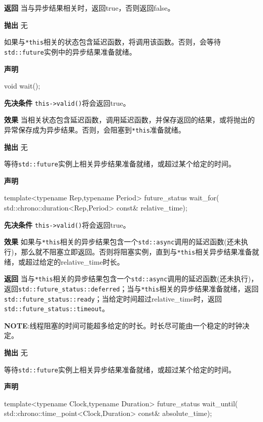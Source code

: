 \textbf{返回}
当与异步结果相关时，返回true，否则返回false。

\textbf{抛出}
无


如果与\texttt{*this}相关的状态包含延迟函数，将调用该函数。否则，会等待\texttt{std::future}实例中的异步结果准备就绪。

\textbf{声明}

\begin{cpp}
void wait();
\end{cpp}

\textbf{先决条件}
\texttt{this->valid()}将会返回true。

\textbf{效果}
当相关状态包含延迟函数，调用延迟函数，并保存返回的结果，或将抛出的异常保存成为异步结果。否则，会阻塞到\texttt{*this}准备就绪。

\textbf{抛出}
无


等待\texttt{std::future}实例上相关异步结果准备就绪，或超过某个给定的时间。

\textbf{声明}

\begin{cpp}
template<typename Rep,typename Period>
future_status wait_for(
    std::chrono::duration<Rep,Period> const& relative_time);
\end{cpp}

\textbf{先决条件}
\texttt{this->valid()}将会返回true。

\textbf{效果}
如果与\texttt{*this}相关的异步结果包含一个\texttt{std::async}调用的延迟函数(还未执行)，那么就不阻塞立即返回。否则将阻塞实例，直到与\texttt{*this}相关异步结果准备就绪，或超过给定的relative\_time时长。

\textbf{返回}
当与\texttt{*this}相关的异步结果包含一个\texttt{std::async}调用的延迟函数(还未执行)，返回\texttt{std::future\_status::deferred}；当与\texttt{*this}相关的异步结果准备就绪，返回\texttt{std::future\_status::ready}；当给定时间超过relative\_time时，返回\texttt{std::future\_status::timeout}。

\textbf{NOTE}:线程阻塞的时间可能超多给定的时长。时长尽可能由一个稳定的时钟决定。

\textbf{抛出}
无


等待\texttt{std::future}实例上相关异步结果准备就绪，或超过某个给定的时间。

\textbf{声明}

\begin{cpp}
template<typename Clock,typename Duration>
future_status wait_until(
  std::chrono::time_point<Clock,Duration> const& absolute_time);
\end{cpp}

